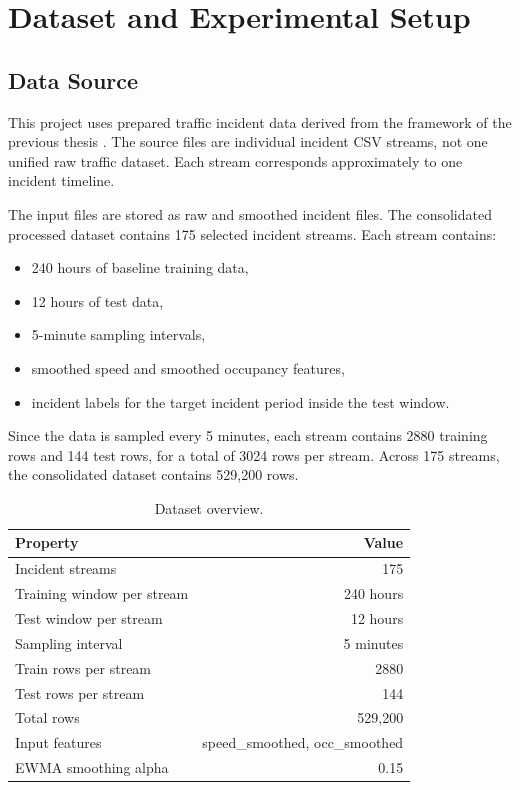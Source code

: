 \documentclass[10pt,a4paper]{article}
\begin{document}
	\section{Dataset and Experimental Setup}
	
	\subsection{Data Source}
	
	This project uses prepared traffic incident data derived from the framework of the previous thesis \cite{abujudom2025}. The source files are individual incident CSV streams, not one unified raw traffic dataset. Each stream corresponds approximately to one incident timeline.
	
	The input files are stored as raw and smoothed incident files. The consolidated processed dataset contains 175 selected incident streams. Each stream contains:
	
	\begin{itemize}
		\item 240 hours of baseline training data,
		\item 12 hours of test data,
		\item 5-minute sampling intervals,
		\item smoothed speed and smoothed occupancy features,
		\item incident labels for the target incident period inside the test window.
	\end{itemize}
	
	Since the data is sampled every 5 minutes, each stream contains 2880 training rows and 144 test rows, for a total of 3024 rows per stream. Across 175 streams, the consolidated dataset contains 529,200 rows.
	
	\begin{table}[H]
		\centering
		\caption{Dataset overview.}
		\begin{tabular}{lr}
			\toprule
			Property & Value \\
			\midrule
			Incident streams & 175 \\
			Training window per stream & 240 hours \\
			Test window per stream & 12 hours \\
			Sampling interval & 5 minutes \\
			Train rows per stream & 2880 \\
			Test rows per stream & 144 \\
			Total rows & 529,200 \\
			Input features & speed\_smoothed, occ\_smoothed \\
			EWMA smoothing alpha & 0.15 \\
			\bottomrule
		\end{tabular}
	\end{table}
	
\end{document}
